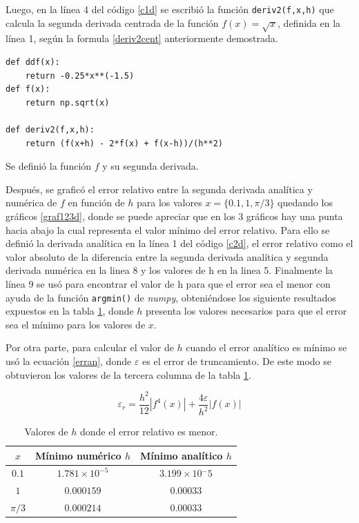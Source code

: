 \documentclass[../portafolio.tex]{subfiles}
\begin{document}
\vspace{5mm}
Luego, en la línea 4 del código \ref{c1d} se escribió la función \texttt{deriv2(f,x,h)} que calcula la segunda derivada centrada de la función $f(x)=\sqrt{x}$, definida en la línea 1,  según la formula \ref{deriv2cent} anteriormente demostrada.

\begin{listing}[ht]
    \begin{verbatim}
def ddf(x):
    return -0.25*x**(-1.5)
def f(x):
    return np.sqrt(x)

def deriv2(f,x,h):
    return (f(x+h) - 2*f(x) + f(x-h))/(h**2)
    \end{verbatim}
\caption{Se definió la función $f$ y su segunda derivada.}
\label{c1d}
\end{listing}

Después, se graficó  el error relativo entre la segunda derivada analítica y numérica de $f$ en función de $h$ para los valores $x=\{0.1, 1, \pi/3\}$ quedando los gráficos \ref{graf123d}, donde se puede apreciar que en los 3 gráficos hay una punta hacia abajo la cual representa el valor mínimo del error relativo. Para ello se definió la derivada analítica en la línea 1 del código \ref{c2d}, el error relativo como el valor absoluto de la diferencia entre la segunda derivada analítica y segunda derivada numérica en la linea 8 y los valores de h en la linea 5. Finalmente la línea 9 se usó para encontrar el valor de h para que el error sea el menor con ayuda de la función \texttt{argmin()} de \textit{numpy}, obteniéndose los siguiente resultados expuestos en la tabla \ref{t1d}, donde $h$ presenta los valores necesarios para que el error sea el mínimo para los valores de $x$.

\vspace{2mm}
Por otra parte, para calcular el valor de $h$ cuando el error analítico es mínimo  se usó la ecuación \ref{erran}, donde $\varepsilon$ es el error de truncamiento. De este modo se obtuvieron los valores de la tercera columna de la tabla \ref{t1d}.

\begin{equation}    
\varepsilon_r = \frac{h^2}{12} |f^4(x)| + \frac{4\varepsilon}{h^2}|f(x)| \label{erran}
\end{equation}

\begin{table}[h]
    \centering
\begin{tabular}{c|c|c}
   $ x$ & Mínimo numérico $h$ & Mínimo analítico $h$  \\ \hline
    $0.1$ & $1.781 \times 10^{-5}$ & $3.199 \times 10{^-5}$ \\
    $1$ & $0.000159$ & $0.00033$\\
    $\pi/3$ & $0.000214$ & $0.00033$
\end{tabular}
    \caption{Valores de $h$ donde el error relativo es menor.}
    \label{t1d}
\end{table}
\end{document}
